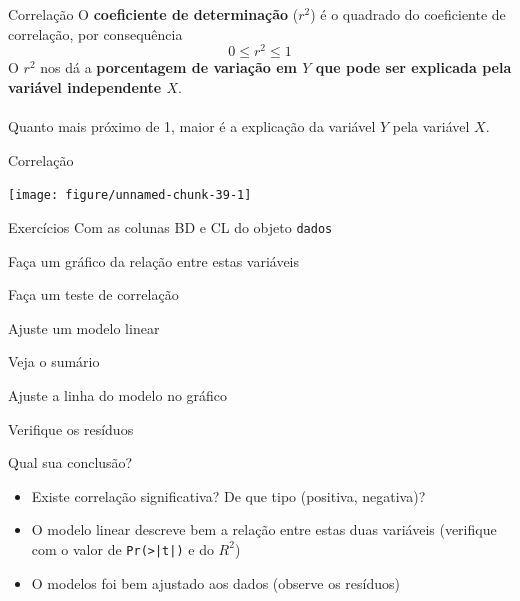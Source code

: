 \documentclass[10pt]{beamer}\usepackage[]{graphicx}\usepackage[]{color}
\newenvironment{knitrout}{}{} %
\theoremstyle{definition}
\begin{document}

\begin{frame}[fragile]{Correlação}
  O \textbf{coeficiente de determinação} ($r^2$) é o quadrado do
  coeficiente de correlação, por consequência
  \begin{equation*}
    0 \leq r^2 \leq 1
  \end{equation*}
  O $r^2$ nos dá a \textbf{porcentagem de variação em $Y$ que pode ser explicada
  pela variável independente $X$}. \\~\\
  Quanto mais próximo de 1, maior é a explicação da variável $Y$ pela
  variável $X$.
\end{frame}

\begin{frame}[fragile]{Correlação}
\begin{knitrout}\small
{}\color{fgcolor}

{\centering \texttt{[image: figure/unnamed-chunk-39-1]} 

}



\end{knitrout}
\end{frame}

\begin{frame}[fragile=singleslide]{Exercícios}
Com as colunas BD e CL do objeto \texttt{dados}
\begin{compactenum}[(1)]
\item Faça um gráfico da relação entre estas variáveis
\item Faça um teste de correlação
\item Ajuste um modelo linear
  \begin{compactenum}[(a)]
  \item Veja o sumário
  \item Ajuste a linha do modelo no gráfico
  \item Verifique os resíduos
  \end{compactenum}
\end{compactenum}
Qual sua conclusão?
\small
\begin{itemize}
\item Existe correlação significativa? De que tipo (positiva, negativa)?
\item O modelo linear descreve bem a relação entre estas duas variáveis
  (verifique com o valor de \verb+Pr(>|t|)+ e do $R^2$)
\item O modelos foi bem ajustado aos dados (observe os resíduos)
\end{itemize}
\end{frame}
\end{document}
